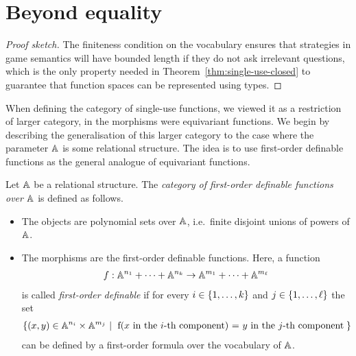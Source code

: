 \section{Beyond equality}
\label{sec:beyond-equality-appendix}
\begin{proof}[Proof sketch]
    The finiteness condition on the vocabulary  ensures that strategies in game semantics will have bounded length if they do not ask irrelevant questions, which is the only property needed in Theorem~\ref{thm:single-use-closed} to guarantee that function spaces can be represented using types. 
\end{proof}


When defining the category of single-use functions, we viewed it as a restriction of larger category, in the morphisms were equivariant functions.  We begin by describing the generalisation of this larger category to the case where the parameter $\mathbb A$ is some relational structure. The idea is to use first-order definable functions as the general analogue of equivariant functions. 

\begin{definition}
    Let $\mathbb A$ be a relational structure. The \emph{category of first-order definable functions over $\mathbb A$} is defined as follows.
    \begin{itemize}
        \item The objects are polynomial sets over $\mathbb A$, i.e.~finite disjoint unions of powers of $\mathbb A$.
        \item The morphisms are the  first-order definable functions. Here, a function 
        \begin{align*}
            f : \mathbb A^{n_1} + \cdots + \mathbb A^{n_k} \to \mathbb A^{m_1} + \cdots + \mathbb A^{m_\ell}
            \end{align*}
            is called  \emph{first-order definable} if for every $i \in \{1,\ldots,k\}$ and  $j \in \{1,\ldots,\ell\}$ the set 
            \begin{align*}
            \setbuild{ (x,y) \in \atoms^{n_i} \times \atoms^{m_j}}{f(\text{$x$ in the $i$-th component}) = \text{$y$ in the $j$-th component}}
            \end{align*}
            can be defined by a first-order formula over the vocabulary of $\mathbb A$.
    \end{itemize}
\end{definition}

